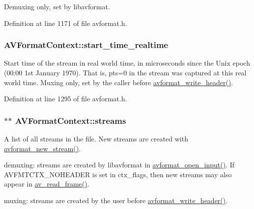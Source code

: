 Demuxing only, set by libavformat. 

Definition at line 1171 of file avformat.\+h.

\subsubsection[{\texorpdfstring{start\+\_\+time\+\_\+realtime}{start_time_realtime}}]{ A\+V\+Format\+Context\+::start\+\_\+time\+\_\+realtime}\hypertarget{struct_a_v_format_context_aa5ddb5cee1df28f21739133f2e37f1c5}{}\label{struct_a_v_format_context_aa5ddb5cee1df28f21739133f2e37f1c5}
Start time of the stream in real world time, in microseconds since the Unix epoch (00\+:00 1st January 1970). That is, pts=0 in the stream was captured at this real world time. Muxing only, set by the caller before \hyperlink{group__lavf__encoding_ga78d4e734fecb1d2385536e6dd5b7b9f5}{avformat\+\_\+write\+\_\+header()}. 

Definition at line 1295 of file avformat.\+h.

\subsubsection[{\texorpdfstring{streams}{streams}}]{$\ast$$\ast$ A\+V\+Format\+Context\+::streams}\hypertarget{struct_a_v_format_context_acfefb6b6cf21e87a0dcbd1a547ba2348}{}\label{struct_a_v_format_context_acfefb6b6cf21e87a0dcbd1a547ba2348}
A list of all streams in the file. New streams are created with \hyperlink{group__lavf__core_gadcb0fd3e507d9b58fe78f61f8ad39827}{avformat\+\_\+new\+\_\+stream()}.


\begin{DoxyItemize}
\item demuxing\+: streams are created by libavformat in \hyperlink{group__lavf__decoding_ga10a404346c646e4ab58f4ed798baca32}{avformat\+\_\+open\+\_\+input()}. If A\+V\+F\+M\+T\+C\+T\+X\+\_\+\+N\+O\+H\+E\+A\+D\+ER is set in ctx\+\_\+flags, then new streams may also appear in \hyperlink{group__lavf__decoding_ga4fdb3084415a82e3810de6ee60e46a61}{av\+\_\+read\+\_\+frame()}.
\item muxing\+: streams are created by the user before \hyperlink{group__lavf__encoding_ga78d4e734fecb1d2385536e6dd5b7b9f5}{avformat\+\_\+write\+\_\+header()}.
\end{DoxyItemize}

